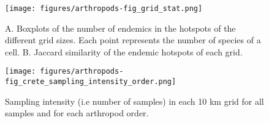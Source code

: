    \begin{figure}[ht]
      \centering
      \texttt{[image: figures/arthropods-fig\_grid\_stat.png]}
      \caption[Grid size comparison for the hotspots]{A. Boxplots of the number of endemics in the hotspots of the different grid sizes. Each point represents the number of species of a cell. B. Jaccard similarity of the endemic hotspots of each grid.}
      \label{fig:arthropods-figS6}
   \end{figure}

   \begin{figure}[ht]
      \centering
      \texttt{[image: figures/arthropods-fig\_crete\_sampling\_intensity\_order.png]}
      \caption[Sampling intensity for every order]{Sampling intensity (i.e number of samples) in each 10 km grid for all samples and for each arthropod order.}
      \label{fig:arthropods-figS7}
   \end{figure}


